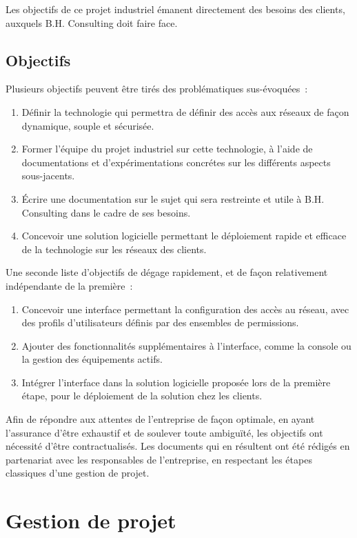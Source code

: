 Les objectifs de ce projet industriel émanent directement des besoins des clients, auxquels B.H. Consulting doit faire face.

\subsection{Objectifs}

Plusieurs objectifs peuvent être tirés des problématiques sus-évoquées~:

\begin{enumerate}
\item Définir la technologie qui permettra de définir des accès aux réseaux de façon dynamique, souple et sécurisée.
\item Former l'équipe du projet industriel sur cette technologie, à l'aide de documentations et d'expérimentations concrétes sur les différents aspects sous-jacents.
\item Écrire une documentation sur le sujet qui sera restreinte et utile à B.H. Consulting dans le cadre de ses besoins.
\item Concevoir une solution logicielle permettant le déploiement rapide et efficace de la technologie sur les réseaux des clients.
\end{enumerate}

Une seconde liste d'objectifs de dégage rapidement, et de façon relativement indépendante de la première~:

\begin{enumerate}
\item Concevoir une interface permettant la configuration des accès au réseau, avec des profils d'utilisateurs définis par des ensembles de permissions.
\item Ajouter des fonctionnalités supplémentaires à l'interface, comme la console ou la gestion des équipements actifs.
\item Intégrer l'interface dans la solution logicielle proposée lors de la première étape, pour le déploiement de la solution chez les clients.
\end{enumerate}

Afin de répondre aux attentes de l'entreprise de façon optimale, en ayant l'assurance d'être exhaustif et de soulever toute ambiguïté, les objectifs ont nécessité d'être contractualisés. Les documents qui en résultent ont été rédigés en partenariat avec les responsables de l'entreprise, en respectant les étapes classiques d'une gestion de projet.

\section{Gestion de projet}
